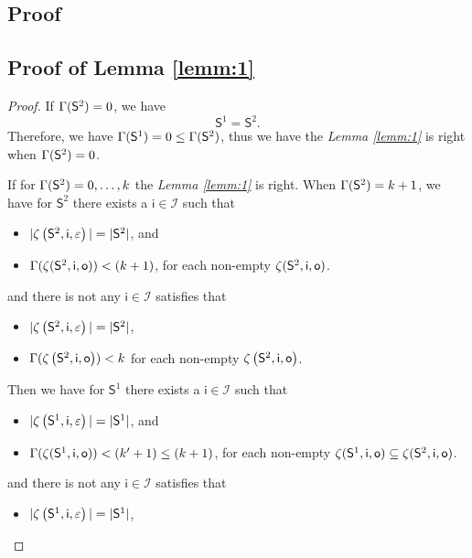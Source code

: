 \begin{appendices}
\section{Proof}
\label{sec:pro}
\subsection{Proof of Lemma \ref{lemm:1}}
\begin{proof}
If $\Gamma(\mathsf{S}^{2})=0$, we have  \[\mathsf{S}^{1} = \mathsf{S}^{2}.\] Therefore, we have $\Gamma(\mathsf{S}^{1})=0\le\Gamma(\mathsf{S}^{2})$, thus we have the {\em Lemma \ref{lemm:1}} is right when $\Gamma(\mathsf{S}^{2})=0$.
 
 If for $\Gamma(\mathsf{S}^{2})=0,\ldots, k$ the {\em Lemma \ref{lemm:1}} is right. When $\Gamma(\mathsf{S}^{2})=k+1$, we have for $\mathsf{S}^{2}$ there exists a $\mathsf{i}\in \mathcal{I}$ such that
 \begin{itemize}
 \item  $|\zeta\left(\mathsf{S}^{2},\mathsf{i},\varepsilon\right)|=|\mathsf{S}^{2}|$, and 
 \item  $\Gamma(\zeta(\mathsf{S}^{2},\mathsf{i},\mathsf{o}))<(k+1)$, for each non-empty $\zeta(\mathsf{S}^{2},\mathsf{i},\mathsf{o})$.
 \end{itemize}
 and there is not any $\mathsf{i} \in \mathcal{I}$ satisfies that
  \begin{itemize}
 \item  $|\zeta\left(\mathsf{S}^{2},\mathsf{i},\varepsilon\right)|=|\mathsf{S}^2|$,
 \item  $\Gamma(\zeta\left(\mathsf{S}^{2},\mathsf{i},\mathsf{o}\right))< k$ for each non-empty $\zeta\left(\mathsf{S}^{2},\mathsf{i},\mathsf{o}\right)$.
 \end{itemize} 
 Then we have for $\mathsf{S}^{1}$ there exists a $\mathsf{i}\in \mathcal{I}$ such that
 \begin{itemize}
 \item  $|\zeta\left(\mathsf{S}^{1},\mathsf{i},\varepsilon\right)|=|\mathsf{S}^{1}|$, and 
 \item  $\Gamma(\zeta(\mathsf{S}^{1},\mathsf{i},\mathsf{o}))<(k'+1)\le (k+1)$, for each non-empty $\zeta(\mathsf{S}^{1},\mathsf{i},\mathsf{o})\subseteq \zeta(\mathsf{S}^{2},\mathsf{i},\mathsf{o})$.
 \end{itemize}
 and there is not any $\mathsf{i} \in \mathcal{I}$ satisfies that
  \begin{itemize}
 \item  $|\zeta\left(\mathsf{S}^{1},\mathsf{i},\varepsilon\right)|=|\mathsf{S}^1|$,

\end{itemize}
\end{proof}
\end{appendices}
